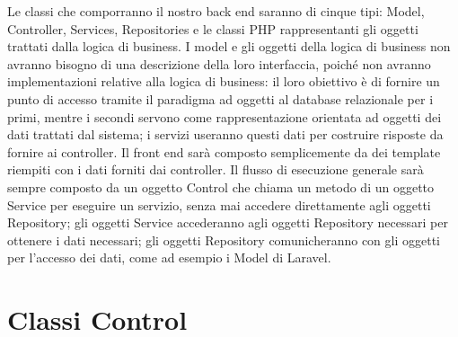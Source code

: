 Le classi che comporranno il nostro back end saranno di cinque tipi: Model, Controller, Services, Repositories e le classi PHP rappresentanti gli oggetti trattati dalla logica di business. I model e gli oggetti della logica di business non avranno bisogno di una descrizione della loro interfaccia, poiché non avranno implementazioni relative alla logica di business: il loro obiettivo è di fornire un punto di accesso tramite il paradigma ad oggetti al database relazionale per i primi, mentre i secondi servono come rappresentazione orientata ad oggetti dei dati trattati dal sistema; i servizi useranno questi dati per costruire risposte da fornire ai controller. Il front end sarà composto semplicemente da dei template riempiti con i dati forniti dai controller. Il flusso di esecuzione generale sarà sempre composto da un oggetto Control che chiama un metodo di un oggetto Service per eseguire un servizio, senza mai accedere direttamente agli oggetti Repository; gli oggetti Service accederanno agli oggetti Repository necessari per ottenere i dati necessari; gli oggetti Repository comunicheranno con gli oggetti per l’accesso dei dati, come ad esempio i Model di Laravel.

\section{Classi Control}
